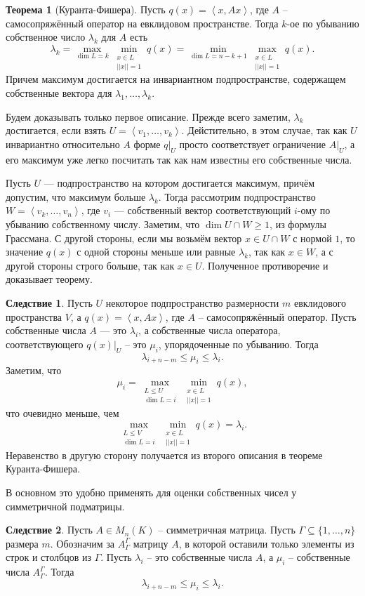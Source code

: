 \documentclass[12pt,a4paper,oneside]{book}
\theoremstyle{definition}
\newtheorem{thm}{\color{red!40!black}Теорема}
\newtheorem{cor}{\color{green!45!black}Следствие}
\renewcommand{\leq}{\leqslant}
\renewcommand{\geq}{\geqslant}
\def\lan{\left\langle }
\def\ran{\right\rangle}
\def\thrm{\begin{thm}}
\def\ethrm{\end{thm}}
\def\crl{\begin{cor}}
\def\ecrl{\end{cor}}
\begin{document}
\thrm[Куранта-Фишера] Пусть $q(x)=\lan x, Ax\ran$, где $A$ -- самосопряжённый оператор на евклидовом пространстве. Тогда $k$-ое по убыванию собственное число $\lambda_k$ для $A$ есть 
$$\lambda_k=\max_{\dim L=k} \min_{\substack{ x\in L \\ ||x||=1}} q(x) = \min_{\dim L=n-k+1} \max_{\substack{ x\in L \\ ||x||=1}} q(x).$$
Причем максимум достигается на инвариантном подпространстве, содержащем собственные вектора для $\lambda_1,\dots,\lambda_k$.
\ethrm
\proof Будем доказывать только первое описание. Прежде всего заметим, $\lambda_k$ достигается, если взять $U=\lan v_1,\dots,v_k\ran$. Дейстительно, в этом случае, так как $U$ инвариантно относительно $A$ форме $q|_U$ просто соответствует ограничение $A|_U$, а его максимум уже легко посчитать так как нам известны его собственные числа.

Пусть $U$ --- подпространство на котором достигается максимум, причём допустим, что максимум больше $\lambda_k$. Тогда рассмотрим подпространство $W=\lan v_k,\dots,v_n\ran$, где $v_i$ --- собственный вектор соответствующий $i$-ому по убыванию собственному числу. Заметим, что $\dim U\cap W\geq 1$, из формулы Грассмана. С другой стороны, если мы возьмём вектор $x\in U \cap W$ с нормой $1$, то значение $q(x)$ с одной стороны меньше или равные $\lambda_k$, так как $x\in W$, а с другой стороны строго больше, так как $x\in U$. Полученное противоречие и доказывает теорему.  
\endproof




\crl Пусть $U$ некоторое подпространство размерности $m$ евклидового пространства $V$, а $q(x)=\lan x, Ax\ran$, где $A$ -- самосопряжённый оператор. Пусть собственные числа $A$ --- это $\lambda_i$, а собственные числа оператора, соответствующего $q(x)|_U$ -- это $\mu_i$, упорядоченные по убыванию. Тогда 
$$\lambda_{i+n-m}\leq \mu_i\leq \lambda_i.$$  
\proof Заметим, что
$$\mu_i=\max_{\substack{L\leq U\\ \dim L=i}} \min_{\substack{ x\in L \\ ||x||=1}} q(x),$$
что очевидно меньше, чем 
$$\max_{\substack{L\leq V\\ \dim L=i}} \min_{\substack{ x\in L \\ ||x||=1}} q(x)=\lambda_i.$$
Неравенство в другую сторону получается из второго описания в теореме Куранта-Фишера.
\endproof
\ecrl

В основном это удобно применять для оценки собственных чисел у симметричной подматрицы.

\crl Пусть $A\in M_n(K)$ -- симметричная матрица. Пусть $\Gamma \subseteq \{1,\dots, n\}$ размера $m$. Обозначим за $A^{\Gamma}_{\Gamma}$ матрицу $A$, в которой оставили только элементы из строк и столбцов из $\Gamma$. Пусть $\lambda_i$ -- это собственные числа $A$, а $\mu_i$ -- собственные числа $A^{\Gamma}_{\Gamma}$. Тогда
$$\lambda_{i+n-m}\leq \mu_i\leq \lambda_i.$$
\ecrl 
\end{document}
